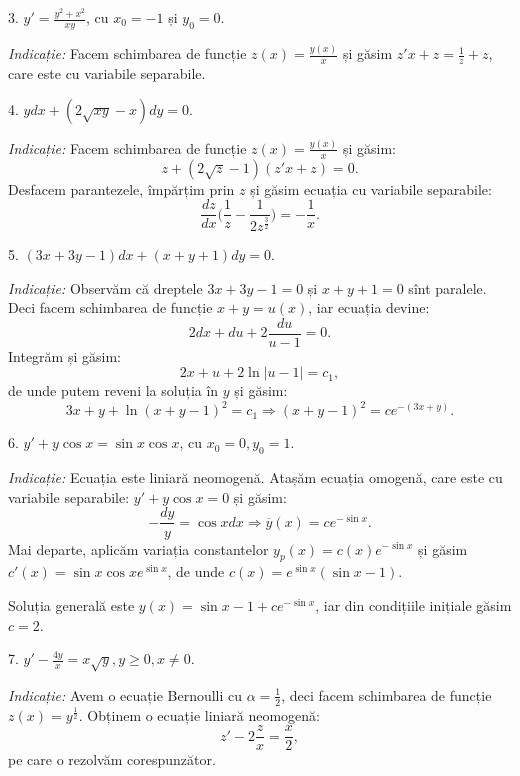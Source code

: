 \documentclass[11pt,a4paper]{article}
\theoremstyle{dotless}
\theoremstyle{dotlessdr}
\begin{document}
\vspace{1cm}

3. $y' = \frac{y^2 + x^2}{xy}$, cu $x_0 = -1$ și $y_0 = 0$.

\emph{Indicație:} Facem schimbarea de funcție $z(x) = \frac{y(x)}{x}$ și
găsim $z' x + z = \frac{1}{z} + z$, care este cu variabile separabile.

\vspace{1cm}

4. $ydx + (2 \sqrt{xy} - x) dy = 0$.

\emph{Indicație:} Facem schimbarea de funcție $z(x) = \frac{y(x)}{x}$ și
găsim:
\[
  z + (2 \sqrt{z} - 1) (z' x + z) = 0.
\]
Desfacem parantezele, împărțim prin $z$ și găsim ecuația cu variabile separabile:
\[
  \frac{dz}{dx} \Big( \frac{1}{z} - \frac{1}{2z^{\frac{3}{2}}} \Big) = -\frac{1}{x}.
\]

\vspace{1cm}

5. $(3x + 3y - 1) dx + (x + y + 1) dy = 0$.

\emph{Indicație:} Observăm că dreptele $3x + 3y - 1 = 0$ și $x + y + 1 = 0$ sînt
paralele. Deci facem schimbarea de funcție $x + y = u(x)$, iar ecuația devine:
\[
  2dx + du + 2 \frac{du}{u - 1} = 0.
\]
Integrăm și găsim:
\[
  2x + u + 2\ln|u - 1| = c_1,
\]
de unde putem reveni la soluția în $y$ și găsim:
\[
  3x + y + \ln(x + y - 1)^2 = c_1 \Rightarrow (x + y - 1)^2 = ce^{-(3x + y)}.
\]

\vspace{1cm}

6. $y' + y\cos x = \sin x \cos x$, cu $x_0 = 0, y_0 = 1$.

\emph{Indicație:} Ecuația este liniară neomogenă. Atașăm ecuația omogenă, care
este cu variabile separabile: $y' + y\cos x = 0$ și găsim:
\[
  -\frac{dy}{y} = \cos x dx \Rightarrow \overline{y}(x) = ce^{-\sin x}.
\]
Mai departe, aplicăm variația constantelor $y_p(x) = c(x)e^{-\sin x}$ și
găsim $c'(x) = \sin x \cos x e^{\sin x}$, de unde $c(x) = e^{\sin x}(\sin x - 1)$.

Soluția generală este $y(x) = \sin x - 1 + ce^{-\sin x}$, iar din condițiile inițiale
găsim $c = 2$.

\vspace{1cm}

7. $y' - \frac{4y}{x} = x \sqrt{y}, y \geq 0, x \neq 0$.

\emph{Indicație:} Avem o ecuație Bernoulli cu $\alpha = \frac{1}{2}$, deci facem
schimbarea de funcție $z(x) = y^{\frac{1}{2}}$. Obținem o ecuație liniară neomogenă:
\[
  z' - 2\frac{z}{x} = \frac{x}{2},
\]
pe care o rezolvăm corespunzător.
\end{document}
